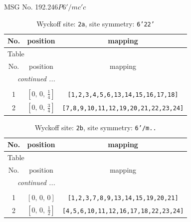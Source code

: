 \documentclass[fleqn,8pt]{jsarticle}
\begin{document}
\setcounter{MaxMatrixCols}{32}

\renewcommand{\tablename}{Table~}
\renewcommand{\figurename}{Figure~}
\begin{center}
\LARGE
MSG No. 192.246\quad$P6'/mc'c$
\end{center}
\renewcommand{\arraystretch}{1.2}
\begin{longtable}{ccc}
\caption{Wyckoff site: {\tt 2a}, site symmetry: {\tt 6'22'}}
 \\
 \hline \hline
No. & position & mapping \\ \hline \endfirsthead

\multicolumn{2}{l}{\tablename\ \thetable{}} \\
 \hline \hline
No. & position & mapping \\ \hline \endhead

 \hline \hline
\multicolumn{2}{r}{\footnotesize\it continued ...} \\ \endfoot

 \hline \hline
\multicolumn{2}{r}{} \\ \endlastfoot

1 & $\left[ 0,\, 0,\, \frac{1}{4} \right]$ & {\tt [1,2,3,4,5,6,13,14,15,16,17,18]} \\ \hline
2 & $\left[ 0,\, 0,\, \frac{3}{4} \right]$ & {\tt [7,8,9,10,11,12,19,20,21,22,23,24]} \\
\end{longtable}
\renewcommand{\arraystretch}{1.2}
\begin{longtable}{ccc}
\caption{Wyckoff site: {\tt 2b}, site symmetry: {\tt 6'/m..}}
 \\
 \hline \hline
No. & position & mapping \\ \hline \endfirsthead

\multicolumn{2}{l}{\tablename\ \thetable{}} \\
 \hline \hline
No. & position & mapping \\ \hline \endhead

 \hline \hline
\multicolumn{2}{r}{\footnotesize\it continued ...} \\ \endfoot

 \hline \hline
\multicolumn{2}{r}{} \\ \endlastfoot

1 & $\left[ 0,\, 0,\, 0 \right]$ & {\tt [1,2,3,7,8,9,13,14,15,19,20,21]} \\ \hline
2 & $\left[ 0,\, 0,\, \frac{1}{2} \right]$ & {\tt [4,5,6,10,11,12,16,17,18,22,23,24]} \\
\end{longtable}
\end{document}
